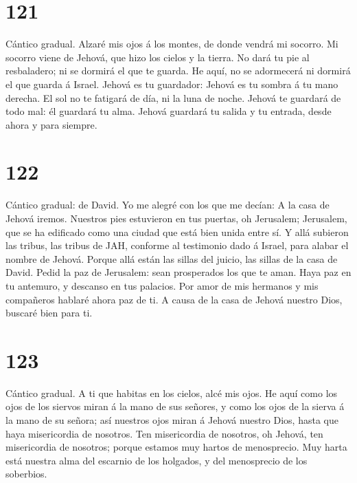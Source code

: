 \hypertarget{section-120}{%
\section{121}\label{section-120}}

 Cántico gradual. Alzaré mis ojos á los montes, de donde
vendrá mi socorro.  Mi socorro viene de Jehová, que hizo
los cielos y la tierra.  No dará tu pie al resbaladero; ni
se dormirá el que te guarda.  He aquí, no se adormecerá ni
dormirá el que guarda á Israel.  Jehová es tu guardador:
Jehová es tu sombra á tu mano derecha.  El sol no te
fatigará de día, ni la luna de noche.  Jehová te guardará
de todo mal: él guardará tu alma.  Jehová guardará tu
salida y tu entrada, desde ahora y para siempre.

\hypertarget{section-121}{%
\section{122}\label{section-121}}

 Cántico gradual: de David. Yo me alegré con los que me
decían: A la casa de Jehová iremos.  Nuestros pies
estuvieron en tus puertas, oh Jerusalem;  Jerusalem, que
se ha edificado como una ciudad que está bien unida entre sí.
 Y allá subieron las tribus, las tribus de JAH, conforme
al testimonio dado á Israel, para alabar el nombre de Jehová.
 Porque allá están las sillas del juicio, las sillas de la
casa de David.  Pedid la paz de Jerusalem: sean
prosperados los que te aman.  Haya paz en tu antemuro, y
descanso en tus palacios.  Por amor de mis hermanos y mis
compañeros hablaré ahora paz de ti.  A causa de la casa de
Jehová nuestro Dios, buscaré bien para ti.

\hypertarget{section-122}{%
\section{123}\label{section-122}}

 Cántico gradual. A ti que habitas en los cielos, alcé mis
ojos.  He aquí como los ojos de los siervos miran á la
mano de sus señores, y como los ojos de la sierva á la mano de su
señora; así nuestros ojos miran á Jehová nuestro Dios, hasta que haya
misericordia de nosotros.  Ten misericordia de nosotros,
oh Jehová, ten misericordia de nosotros; porque estamos muy hartos de
menosprecio.  Muy harta está nuestra alma del escarnio de
los holgados, y del menosprecio de los soberbios.

